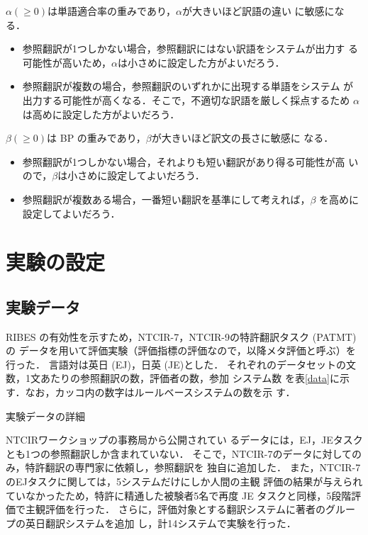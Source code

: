 \documentclass[japanese]{jnlp_1.4}
\begin{document}
$\alpha (\ge 0)$は単語適合率の重みであり，$\alpha$が大きいほど訳語の違い
に敏感になる．

\begin{itemize}
 \item 参照翻訳が1つしかない場合，参照翻訳にはない訳語をシステムが出力す
       る可能性が高いため，$\alpha$は小さめに設定した方がよいだろう．
 \item 参照翻訳が複数の場合，参照翻訳のいずれかに出現する単語をシステム
       が出力する可能性が高くなる．そこで，不適切な訳語を厳しく採点するため
       $\alpha$は高めに設定した方がよいだろう．
\end{itemize}

$\beta (\ge 0)$は BP の重みであり，$\beta$が大きいほど訳文の長さに敏感に
なる．

\begin{itemize}
 \item 参照翻訳が1つしかない場合，それよりも短い翻訳があり得る可能性が高
       いので，$\beta$は小さめに設定してよいだろう．
 \item 参照翻訳が複数ある場合，一番短い翻訳を基準にして考えれば，$\beta$
       を高めに設定してよいだろう．
\end{itemize}


\section{実験の設定}


\subsection{実験データ}

RIBES の有効性を示すため，NTCIR-7，NTCIR-9の特許翻訳タスク (PATMT) の
データを用いて評価実験（評価指標の評価なので，以降メタ評価と呼ぶ）を行った．
言語対は英日 (EJ)，日英 (JE)とした．
それぞれのデータセットの文数，1文あたりの参照翻訳の数，評価者の数，参加
システム数
を表\ref{data}に示す．なお，カッコ内の数字はルールベースシステムの数を示
す．

\begin{table}[b]
  \caption{実験データの詳細}
  \label{data}

\end{table}

NTCIRワークショップの事務局から公開されてい
るデータには，EJ，JEタスクとも1つの参照翻訳しか含まれていない．
そこで，NTCIR-7のデータに対してのみ，特許翻訳の専門家に依頼し，参照翻訳を
独自に追加した．
また，NTCIR-7のEJタスクに関しては，5システムだけにしか人間の主観
評価の結果が与えられていなかったため，特許に精通した被験者5名で再度 JE
タスクと同様，5段階評価で主観評価を行った．
さらに，評価対象とする翻訳システムに著者のグループの英日翻訳システム\cite{headfinal}を追加
し，計14システムで実験を行った．
\end{document}
